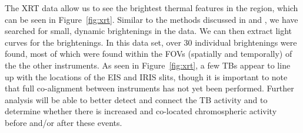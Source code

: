 \documentclass[twocolumn]{aastex62}
\begin{document}
The XRT data allow us to see the brightest thermal features in the region, which can be seen in Figure~\ref{fig:xrt}. Similar to the methods discussed in \citet{2014KobelskiEA_XRTTBs} and \citet{2014KobelskiMcKenzie_HiC}, we have searched for small, dynamic brightenings in the data. We can then extract light curves for the brightenings. In this data set, over 30 individual brightenings were found, most of which were found within the FOVs (spatially and temporally) of the the other instruments. As seen in Figure~\ref{fig:xrt}, a few TBs appear to line up with the locations of the EIS and IRIS slits, though it is important to note that full co-alignment between instruments has not yet been performed. Further analysis will be able to better detect and connect the TB activity and to determine whether there is increased and co-located chromospheric activity before and/or after these events.
\end{document}
